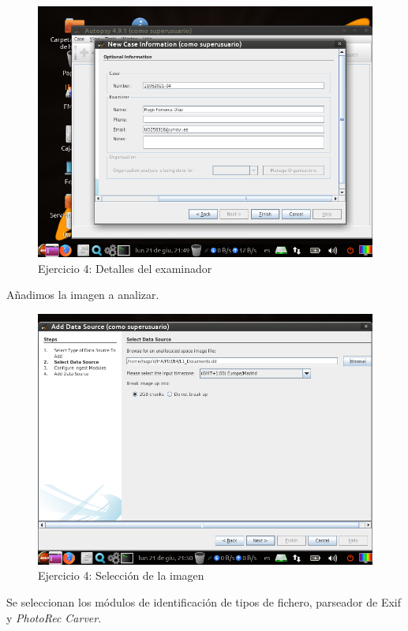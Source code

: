 \documentclass[11pt]{article}
\begin{document}
\begin{figure}[H]
    \caption{Ejercicio 4: Detalles del examinador}
    \centering
    \includegraphics[scale=0.7]{e4-2.png}
\end{figure}

Añadimos la imagen a analizar.

\begin{figure}[H]
    \caption{Ejercicio 4: Selección de la imagen}
    \centering
    \includegraphics[scale=0.7]{e4-3.png}
\end{figure}

Se seleccionan los módulos de identificación de tipos de fichero, parseador de Exif y \textit{PhotoRec Carver}.
\end{document}
